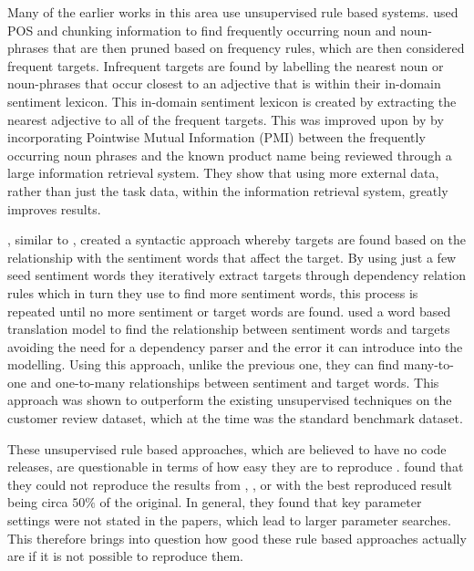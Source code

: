 Many of the earlier works in this area use unsupervised rule based systems. \citet{hu2004mining_target_terms} used POS and chunking information to find frequently occurring noun and noun-phrases that are then pruned based on frequency rules, which are then considered frequent targets. Infrequent targets are found by labelling the nearest noun or noun-phrases that occur closest to an adjective that is within their in-domain sentiment lexicon. This in-domain sentiment lexicon is created by extracting the nearest adjective to all of the frequent targets. This was improved upon by \citep{popescu-etzioni-2005-extracting} by incorporating Pointwise Mutual Information (PMI) \citep{church-hanks-1989-word} between the frequently occurring noun phrases and the known product name being reviewed through a large information retrieval system. They show that using more external data, rather than just the task data, within the information retrieval system, greatly improves results.

\citet{qiu-etal-2011-opinion}, similar to \citet{hu2004mining_target_terms}, created a syntactic approach whereby targets are found based on the relationship with the sentiment words that affect the target. By using just a few seed sentiment words they iteratively extract targets through dependency relation rules which in turn they use to find more sentiment words, this process is repeated until no more sentiment or target words are found. \citet{liu-etal-2012-opinion} used a word based translation model to find the relationship between sentiment words and targets avoiding the need for a dependency parser and the error it can introduce into the modelling. Using this approach, unlike the previous one, they can find many-to-one and one-to-many relationships between sentiment and target words. This approach was shown to outperform the existing unsupervised techniques on the \citet{hu2004mining_target_terms} customer review dataset, which at the time was the standard benchmark dataset. 

These unsupervised rule based approaches, which are believed to have no code releases, are questionable in terms of how easy they are to reproduce \citep{marrese-taylor-matsuo-2017-replication}. \citet{marrese-taylor-matsuo-2017-replication} found that they could not reproduce the results from \citet{hu2004mining_target_terms}, \citet{qiu-etal-2011-opinion}, or \citet{liu-etal-2012-opinion} with the best reproduced result being circa $50\%$ of the original. In general, they found that key parameter settings were not stated in the papers, which lead to larger parameter searches. This therefore brings into question how good these rule based approaches actually are if it is not possible to reproduce them.


